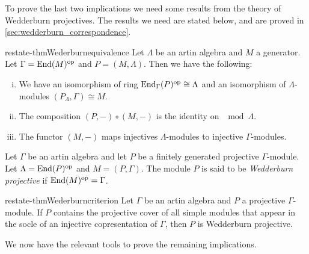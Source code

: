To prove the last two implications we need some results from the theory of Wedderburn projectives. The results we need are stated below, and are proved in \cref{sec:wedderburn_correspondence}.

\begin{restatable}{restate-thm}{Wederburnequivalence} \label{thm:hom_generator_equivalence}
	Let $\Lambda$ be an artin algebra and $M$ a generator. Let $\Gamma = \operatorname{End}(M)^{\operatorname{op}}$ and $P=(M, \Lambda)$. Then we have the following:
	\begin{enumerate}[i)]
		\item We have an isomorphism of ring $\operatorname{End}_\Gamma(P)^{\operatorname{op}} \cong \Lambda$ and an isomorphism of $\Lambda$-modules $(P_\Lambda, \Gamma) \cong M$.
		\item The composition $(P,-)\circ (M,-)$ is the identity on $\mod\Lambda$.
		\item The functor $(M,-)$ maps injectives $\Lambda$-modules to injective $\Gamma$-modules. 
	\end{enumerate}
\end{restatable}

\begin{defn}
	Let $\Gamma$ be an artin algebra and let $P$ be a finitely generated projective $\Gamma$-module. Let $\Lambda = \operatorname{End}(P)^{\operatorname{op}}$ and $M=(P, \Gamma)$. The module $P$ is said to be \emph{Wedderburn projective} if $\operatorname{End}(M)^{\operatorname{op}}=\Gamma$.
\end{defn}

\begin{restatable}{restate-thm}{Wederburncriterion}\label{thm:wedderburn_criterion}
	Let $\Gamma$ be an artin algebra and $P$ a projective $\Gamma$-module. If $P$ contains the projective cover of all simple modules that appear in the socle of an injective copresentation of $\Gamma$, then $P$ is Wedderburn projective.
\end{restatable}

We now have the relevant tools to prove the remaining implications.

